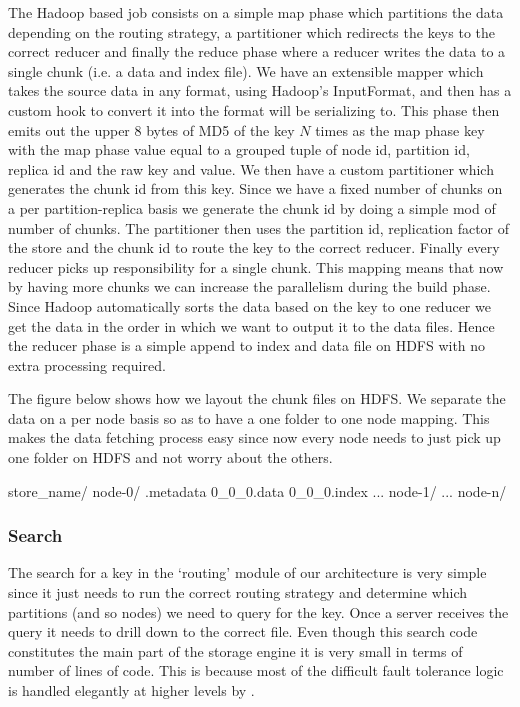 \documentclass[10pt,twocolumn,preprint,natbib,authoryear]{sigplanconf}
\begin{document}
The Hadoop based job consists on a simple map phase which partitions the data depending on the routing strategy, a partitioner which redirects the keys to the correct reducer and finally the reduce phase where a reducer writes the data to a single chunk (i.e. a data and index file). We have an extensible mapper which takes the source data in any format, using Hadoop's InputFormat, and then has a custom hook to convert it into the format \projectname{} will be serializing to. This phase then emits out the upper 8 bytes of MD5 of the \projectname{} key $N$ times as the map phase key with the map phase value equal to a grouped tuple of node id, partition id, replica id and the raw \projectname{} key and value. We then have a custom partitioner which generates the chunk id from this key. Since we have a fixed number of chunks on a per partition-replica basis we generate the chunk id by doing a simple mod of number of chunks. The partitioner then uses the partition id, replication factor of the store and the chunk id to route the key to the correct reducer. Finally every reducer picks up responsibility for a single chunk. This mapping means that now by having more chunks we can increase the parallelism during the build phase. Since Hadoop automatically sorts the data based on the key to one reducer we get the data in the order in which we want to output it to the data files. Hence the reducer phase is a simple append to index and data file on HDFS with no extra processing required.  

The figure below shows how we layout the chunk files on HDFS. We separate the data on a per node basis so as to have a one folder to one node mapping. This makes the data fetching process easy since now every node needs to just pick up one folder on HDFS and not worry about the others.

\scriptsize
\begin{verbatimtab}
store_name/
  node-0/
    .metadata
    0_0_0.data
    0_0_0.index
    ...
  node-1/
  ...
  node-n/
\end{verbatimtab}
\normalsize


\subsubsection{Search}
\label{sec:read_only:search}

The search for a key in the `routing' module of our architecture is very simple since it just needs to run the correct routing strategy and determine which partitions (and so nodes) we need to query for the key. Once a server receives the query it needs to drill down to the correct file. Even though this search code constitutes the main part of the storage engine it is very small in terms of number of lines of code. This is because most of the difficult fault tolerance logic is handled elegantly at higher levels by \projectname{}.
\end{document}
